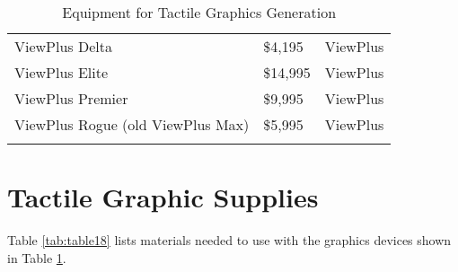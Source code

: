\begin{longtable}[]{@{}
	>{\raggedright\arraybackslash}m{}
	>{\raggedright\arraybackslash}m{}
	>{\raggedright\arraybackslash}b{}@{}
	}
	ViewPlus Delta                                      & \$4,195\footnotemark[6]                                                                                                                                                   & ViewPlus            \\ \cdashline{1-3}
	ViewPlus Elite                                      & \$14,995\footnotemark[6]                                                                                                                                                  & ViewPlus            \\ \cdashline{1-3}
	ViewPlus Premier                                    & \$9,995\footnotemark[6]                                                                                                                                                   & ViewPlus            \\ \cdashline{1-3}
	ViewPlus Rogue \break (old ViewPlus Max)     & \$5,995\footnotemark[6]                                                                                                                                                   & ViewPlus            \\[1.0em]\hline
	\caption{ Equipment for Tactile Graphics Generation}\label{tab:table17}
\end{longtable}\clearpage

\pagebreak
\hypertarget{tactile-paper}{}\section{Tactile Graphic Supplies}\label{tactile-paper}
Table \ref{tab:table18} lists materials needed to use with the graphics devices shown in Table \ref{tab:table17}.

\pagebreak 
 
